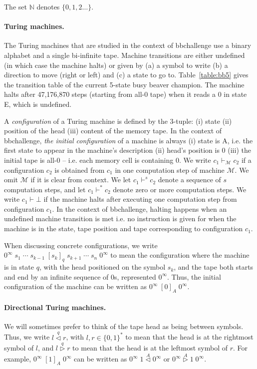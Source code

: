 \documentclass[a4paper,british]{article}
\theoremstyle{definition} %
\numberwithin{equation}{section}
\theoremstyle{definition} %
\newcommand{\lhead}[1]{\stackrel{#1}\triangleleft}
\newcommand{\rhead}[1]{\stackrel{#1}\triangleright}
\begin{document}
The set $\mathbb{N}$ denotes $\{0,1,2\dots\}$.

\paragraph*{Turing machines.}The Turing machines that are studied in the context of bbchallenge use a binary alphabet and a single bi-infinite tape. Machine transitions are either undefined (in which case the machine halts) or given by (a) a symbol to write (b) a direction to move (right or left) and (c) a state to go to. Table~\ref{table:bb5} gives the transition table of the current 5-state busy beaver champion. The machine halts after 47,176,870 steps (starting from all-0 tape) when it reads a 0 in state E, which is undefined.

A \textit{configuration} of a Turing machine is defined by the 3-tuple: (i) state (ii) position of the head (iii) content of the memory tape. In the context of bbchallenge, \textit{the initial configuration} of a machine is always (i) state is A, i.e. the first state to appear in the machine's description (ii) head's position is 0 (iii) the initial tape is all-0 -- i.e. each memory cell is containing 0. We write $c_1 \vdash_\mathcal{M} c_2$ if a configuration $c_2$ is obtained from $c_1$ in one computation step of machine $\mathcal{M}$. We omit $\mathcal{M}$ if it is clear from context. We let $c_1 \vdash^s c_2$ denote a sequence of $s$ computation steps, and let $c_1 \vdash^* c_2$ denote zero or more computation steps. %
We write $c_1 \vdash \bot$ if the machine halts after executing one computation step from configuration $c_1$. In the context of bbchallenge, halting happens when an undefined machine transition is met i.e. no instruction is given for when the machine is in the state, tape position and tape corresponding to configuration $c_1$.

When discussing concrete configurations, we write
$0^\infty\; s_1\; \cdots\; s_{k-1}\; [s_k]_q\; s_{k+1}\; \cdots\; s_n\; 0^\infty$
to mean the configuration where the machine is in state $q$, with the head
positioned on the symbol $s_k$, and the tape both starts and end by an infinite sequence of 0s, represented $0^\infty$. Thus, the initial configuration of the machine
can be written as $0^\infty\; [0]_A\; 0^\infty$.

\paragraph*{Directional Turing machines.} We will sometimes prefer to think of the tape head as being between
symbols. Thus, we write $l \lhead{q} r$, with $l,r\in\{0,1\}^*$ to mean that the head is at the rightmost symbol
of $l$, and $l \rhead{q} r$ to mean that the head is at the leftmost symbol of $r$.
For example, $0^\infty\; [1]_A\; 0^\infty$ can be written as
$0^\infty\; 1 \lhead A 0^\infty$ or $0^\infty \rhead A 1\; 0^\infty$.
\end{document}
